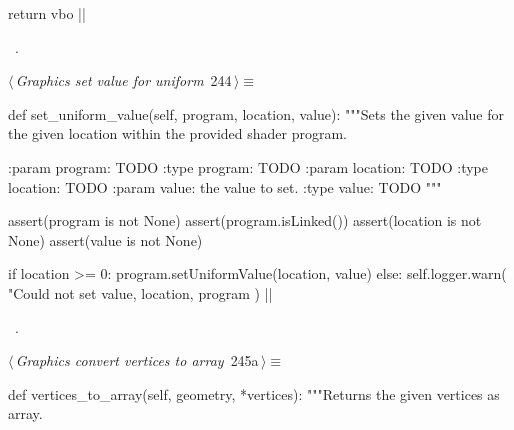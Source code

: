 \documentclass[%
    a4paper,    %
    justified,  %
    nobib,      %
    openany     %
]{tufte-book}
\makeatletter
\renewcommand{\label}[1]{\@tufte@label{##1}}%
\makeatother
\begin{document}
\begin{fullwidth}
\begin{flushleft}
\begin{minipage}{\linewidth}
\begin{pythoncode}
    return vbo
|\NWsep|
\end{pythoncode}
\vspace{1.5ex}
\footnotesize
\begin{list}{}{\setlength{\itemsep}{-\parsep}\setlength{\itemindent}{-\leftmargin}}
\item \NWtxtMacroRefIn\ .

\item{}
\end{list}
\end{minipage}\vspace{4ex}
\end{flushleft}
\begin{flushleft} \small
\begin{minipage}{\linewidth}\label{scrap264}\raggedright\small
{} $\langle\,${\itshape Graphics set value for uniform}\nobreak\ {\footnotesize {244}}$\,\rangle\equiv$
\vspace{-1ex}
\begin{pythoncode}
def set_uniform_value(self, program, location, value):
    """Sets the given value for the given location within the provided
    shader program.

    :param program: TODO
    :type program: TODO
    :param location: TODO
    :type location: TODO
    :param value: the value to set.
    :type value: TODO
    """

    assert(program is not None)
    assert(program.isLinked())
    assert(location is not None)
    assert(value is not None)

    if location >= 0:
        program.setUniformValue(location, value)
    else:
        self.logger.warn(
            "Could not set %
            value,
            location,
            program
        )
|\NWsep|
\end{pythoncode}
\vspace{1.5ex}
\footnotesize
\begin{list}{}{\setlength{\itemsep}{-\parsep}\setlength{\itemindent}{-\leftmargin}}
\item \NWtxtMacroRefIn\ .

\item{}
\end{list}
\end{minipage}\vspace{4ex}
\end{flushleft}
\begin{flushleft} \small
\begin{minipage}{\linewidth}\label{scrap265}\raggedright\small
{} $\langle\,${\itshape Graphics convert vertices to array}\nobreak\ {\footnotesize {245a}}$\,\rangle\equiv$
\vspace{-1ex}
\begin{pythoncode}
def vertices_to_array(self, geometry, *vertices):
    """Returns the given vertices as array.


\end{pythoncode}
\end{minipage}
\end{flushleft}
\end{fullwidth}
\end{document}
